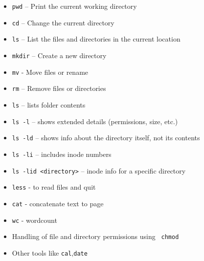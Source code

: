 \documentclass[a4paper,12pt=]{article}
\begin{document}
    \begin{itemize}
    
        \item \texttt{pwd} – Print the current working directory
        \item \texttt{cd} – Change the current directory
        \item \texttt{ls} – List the files and directories in the current location
        \item \texttt{mkdir} – Create a new directory
        \item \texttt{mv} - Move files or rename
        \item \texttt{rm} – Remove files or directories
    
        \item \texttt{ls} – lists folder contents
        \item \texttt{ls -l} – shows extended details (permissions, size, etc.)
        \item \texttt{ls -ld} – shows info about the directory itself, not its contents
        \item \texttt{ls -li} – includes inode numbers
        \item \texttt{ls -lid <directory>} – inode info for a specific directory
        \item \texttt{less} - to read files and quit
        \item \texttt{cat} - concatenate text to page
        \item \texttt{wc} - wordcount
         \item Handling of file and directory permissions using \texttt{ chmod} 
        \item Other tools like \texttt{cal},\texttt{date}
    \end{itemize}
\end{document}
